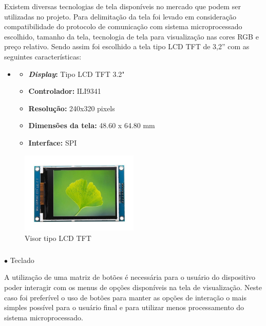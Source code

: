         Existem diversas tecnologias de tela disponíveis no mercado que podem ser utilizadas no projeto. Para delimitação da tela foi levado em consideração compatibilidade do protocolo de comunicação com sistema microprocessado escolhido, tamanho da tela, tecnologia de tela para visualização nas cores RGB e preço relativo. Sendo assim foi escolhido a tela tipo LCD TFT de 3,2” com as seguintes características:
        
        \vspace{-0.2cm}
        \begin{itemize}
            \item[ ] 
            \begin{itemize}
            \item \textbf{\textit{Display}:} Tipo LCD TFT 3.2" 
            \item \textbf{Controlador:} ILI9341
            \item \textbf{Resolução:} 240x320 pixels
            \item \textbf{Dimensões da tela:} 48.60 x 64.80 mm
            \item \textbf{Interface:} SPI
            \end{itemize}
        \end{itemize}
        
        \vspace{-0.2cm}
        \begin{figure}[H]
            \centering
            \includegraphics[width=0.5\textwidth]{figuras/Display-LCD-TFT-3.2-240x320-6.jpg}
            \caption{Visor tipo LCD TFT}
            \label{fig:display_lcd}
        \end{figure}
        
        
        \subparagraph*{}$\bullet$ Teclado \hfill
        
        
        A utilização de uma matriz de botões é necessária para o usuário do dispositivo poder interagir com os menus de opções disponíveis na tela de visualização. Neste caso foi preferível o uso de botões para manter as opções de interação o mais simples possível para o usuário final e para utilizar menos processamento do sistema microprocessado.
        
